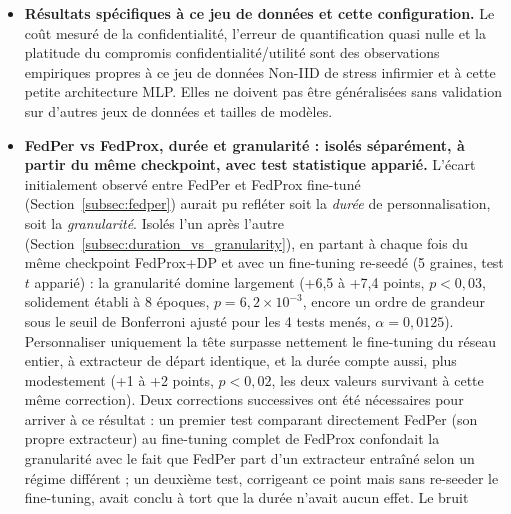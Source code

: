 \documentclass{article}
\begin{document}
\begin{itemize}
  explorées dans ce travail et constituent la suite naturelle de cette étude. Une piste
  plus ciblée, et la mieux étayée empiriquement parmi celles listées ici, ressort du
  scénario du nouvel arrivant (Section~\ref{subsec:late_joiner_recall}) : le seuil de
  décision optimal après adaptation locale diverge en sens opposé selon le client
  ($0{,}001$ contre $0{,}950$ sur les deux cas testés), ce qui suggère qu'une
  calibration de seuil \emph{par client}, réalisée sur un split de validation dédié et
  distinct du test, pourrait apporter un gain de rappel clinique sans modifier le
  modèle lui-même, une piste peu coûteuse à valider dans une itération future.
  \item \textbf{Résultats spécifiques à ce jeu de données et cette configuration.}
  Le coût mesuré de la confidentialité, l'erreur de quantification quasi nulle et la
  platitude du compromis confidentialité/utilité sont des observations empiriques
  propres à ce jeu de données Non-IID de stress infirmier et à cette petite
  architecture MLP. Elles ne doivent pas être généralisées sans validation sur
  d'autres jeux de données et tailles de modèles.
  \item \textbf{FedPer vs FedProx, durée et granularité : isolés séparément, à partir
  du même checkpoint, avec test statistique apparié.} L'écart initialement observé
  entre FedPer et FedProx fine-tuné (Section~\ref{subsec:fedper}) aurait pu refléter
  soit la \emph{durée} de personnalisation, soit la \emph{granularité}. Isolés l'un
  après l'autre (Section~\ref{subsec:duration_vs_granularity}), en partant à chaque
  fois du même checkpoint FedProx+DP et avec un fine-tuning re-seedé (5 graines,
  test $t$ apparié) : la granularité domine largement (+6,5 à +7,4 points,
  $p<0{,}03$, solidement établi à 8 époques, $p=6{,}2\times10^{-3}$, encore un ordre
  de grandeur sous le seuil de Bonferroni ajusté pour les 4 tests menés,
  $\alpha=0{,}0125$). Personnaliser uniquement la tête surpasse nettement le
  fine-tuning du réseau entier, à extracteur de départ identique, et la durée compte
  aussi, plus modestement (+1 à +2 points, $p<0{,}02$, les deux valeurs survivant à
  cette même correction). Deux corrections successives ont été
  nécessaires pour arriver à ce résultat : un premier test comparant directement
  FedPer (son propre extracteur) au fine-tuning complet de FedProx confondait la
  granularité avec le fait que FedPer part d'un extracteur entraîné selon un régime
  différent ; un deuxième test, corrigeant ce point mais sans re-seeder le
  fine-tuning, avait conclu à tort que la durée n'avait aucun effet. Le bruit

\end{itemize}
\end{document}
